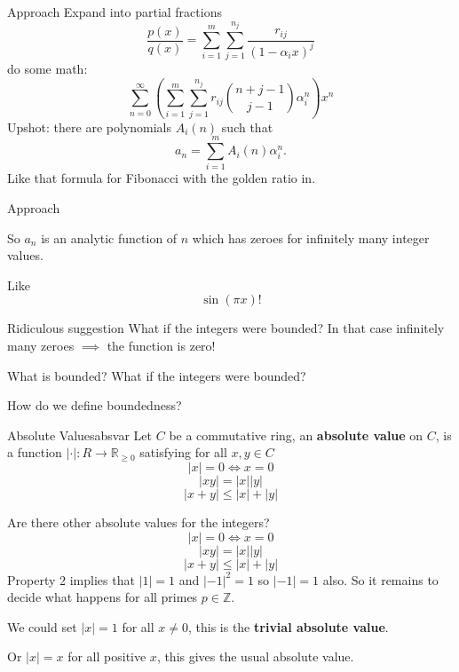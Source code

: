 \documentclass[notheorems]{beamer}
\theoremstyle{plain}
\newcommand{\terminology}[1]{\textbf{#1}}
\newcommand{\ZZ}{\mathbb{Z}}
\newcommand{\RR}{\mathbb R}
\begin{document}
\begin{frame}{Approach}
    Expand into partial fractions%
    \begin{equation*}
        \frac{p(x)}{q(x)} = \sum_{i = 1}^m \sum_{j=1}^{n_j} \frac{r_{ij}}{(1-\alpha_i x)^j}
    \end{equation*}
    \pause
    do some math:
    \begin{equation*}
        \sum_{n=0}^\infty \left(\sum_{i = 1}^m \sum_{j=1}^{n_j} r_{ij} \binom{n+j-1}{j-1}  \alpha_i^n\right) x^n
    \end{equation*}
    \pause
    Upshot: there are polynomials \(A_i(n)\) such that%
    \begin{equation*}
        a_n = \sum_{i=1}^m A_i(n)\alpha_i^n\text{.}
    \end{equation*}
    Like that formula for Fibonacci with the golden ratio in.
\end{frame}

\begin{frame}{Approach}

    So \(a_n\) is an analytic function of \(n\) which has zeroes for infinitely many integer values.
    \par\pause
    Like \[\sin(\pi x)!\]
    \par\pause
    \begin{alertblock}{Ridiculous suggestion}
        What if the integers were bounded? In that case infinitely many zeroes \(\implies\) the function is zero!
    \end{alertblock}
\end{frame}

\begin{frame}{What is bounded?}
    What if the integers were bounded?

    How do we define boundedness?

    \begin{definition}{Absolute Values}{absvar}
        Let $C$ be a commutative ring,
        an \terminology{absolute value} on $C$, is a function
        \(|\cdot | \colon R \to \RR_{\ge 0}\)
        satisfying for all $x,y \in C$
        \[|x| = 0 \iff x = 0\]
        \[|xy| = |x ||y|\]
        \[|x+y| \le |x | + |y|\]
    \end{definition}
\end{frame}

\begin{frame}{Are there other absolute values for the integers?}
    \[|x| = 0 \iff x = 0\]
    \[|xy| = |x ||y|\]
    \[|x+y| \le |x | + |y|\]
    Property 2 implies that $|1|=1$ and $|-1|^2 = 1$ so $|-1|=1$ also.
    So it remains to decide what happens for all primes $p\in \ZZ$.

    We could set $|x|=1$ for all $x \ne 0$, this is the \terminology{trivial absolute value}.

    Or $|x|=x$ for all positive $x$, this gives the usual absolute value.
\end{frame}
\end{document}
